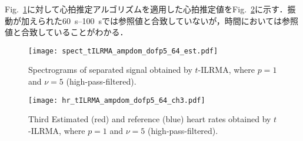 \documentclass[a4j]{jsarticle}
\begin{document}
Fig.~\ref{fig:stilrmaa5}に対して心拍推定アルゴリズムを適用した心拍推定値をFig.~\ref{fig:hrtilrmaa5}に示す．振動が加えられた60~s--100~sでは参照値と合致していないが，時間においては参照値と合致していることがわかる．

\begin{figure}[b]
  \centering
  \vspace{0pt} %
  \texttt{[image: spect\_tILRMA\_ampdom\_dofp5\_64\_est.pdf]}
  \vspace{0pt} %
  \caption{Spectrograms of separated signal obtained by $t$-ILRMA, where $p=1$ and $\nu=5$ (high-pass-filtered).}
  \vspace{0pt} %
  \label{fig:stilrmaa5}
\end{figure}

\begin{figure}[t]
  \centering
  \vspace{0pt} %
  \texttt{[image: hr\_tILRMA\_ampdom\_dofp5\_64\_ch3.pdf]}
  \vspace{0pt} %
  \caption{Third Estimated (red) and reference (blue) heart rates obtained by $t$-ILRMA, where $p=1$ and $\nu=5$ (high-pass-filtered).}
  \vspace{0pt} %
  \label{fig:hrtilrmaa5}
\end{figure}
\end{document}
